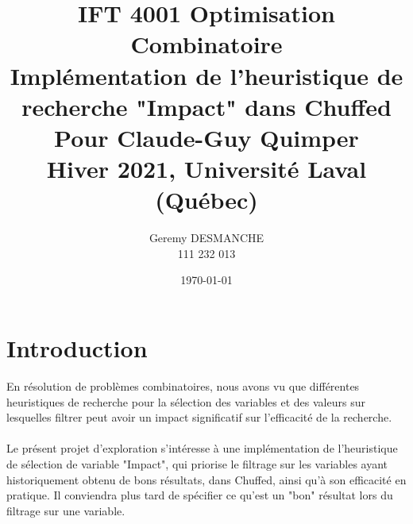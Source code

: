 \documentclass{article}
\begin{document}
\title{
	IFT 4001 Optimisation Combinatoire \\
	\textbf{
	Implémentation de l'heuristique de recherche "Impact" dans Chuffed \\
	}
	Pour Claude-Guy Quimper \\
	Hiver 2021, Université  Laval (Québec) \\
}
\author{ Geremy DESMANCHE \\ 111 232 013}
\date{\today}

\maketitle
\pagebreak

\section{Introduction}
En résolution de problèmes combinatoires, nous avons vu que différentes
heuristiques de recherche pour la sélection des variables et des valeurs
sur lesquelles filtrer peut avoir un impact significatif sur l'efficacité
de la recherche. \\
\\
Le présent projet d'exploration s'intéresse à une implémentation de 
l'heuristique de sélection de variable "Impact", qui priorise le filtrage
sur les variables ayant historiquement obtenu de bons résultats, dans
Chuffed, ainsi qu'à son efficacité en pratique. Il conviendra plus tard
de spécifier ce qu'est un "bon" résultat lors du filtrage sur une variable.
\end{document}
